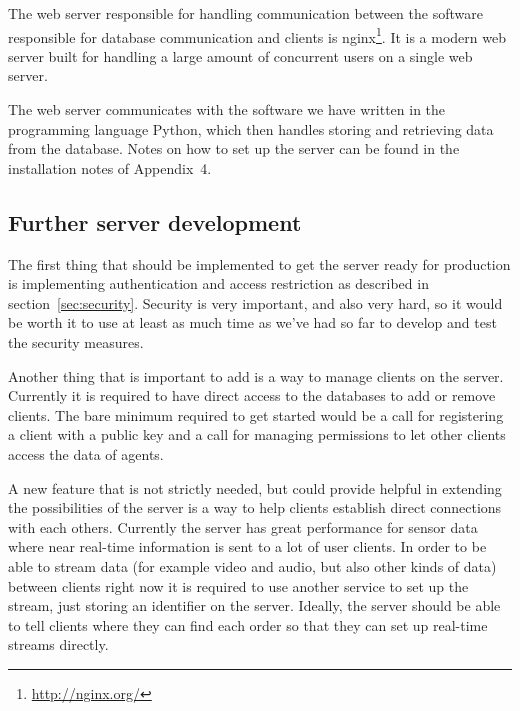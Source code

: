 The web server responsible for handling communication between the software responsible for database communication and clients is nginx\footnote{\url{http://nginx.org/}}.
It is a modern web server built for handling a large amount of concurrent users on a single web server.

The web server communicates with the software we have written in the programming language Python, which then handles storing and retrieving data from the database.
Notes on how to set up the server can be found in the installation notes of Appendix~4.

\subsection{Further server development}
The first thing that should be implemented to get the server ready for production is implementing authentication and access restriction as described in section~\ref{sec:security}.
Security is very important, and also very hard, so it would be worth it to use at least as much time as we've had so far to develop and test the security measures.

Another thing that is important to add is a way to manage clients on the server.
Currently it is required to have direct access to the databases to add or remove clients.
The bare minimum required to get started would be a call for registering a client with a public key and a call for managing permissions to let other clients access the data of agents.

A new feature that is not strictly needed, but could provide helpful in extending the possibilities of the server is a way to help clients establish direct connections with each others.
Currently the server has great performance for sensor data where near real-time information is sent to a lot of user clients.
In order to be able to stream data (for example video and audio, but also other kinds of data) between clients right now it is required to use another service to set up the stream, just storing an identifier on the server.
Ideally, the server should be able to tell clients where they can find each order so that they can set up real-time streams directly.

